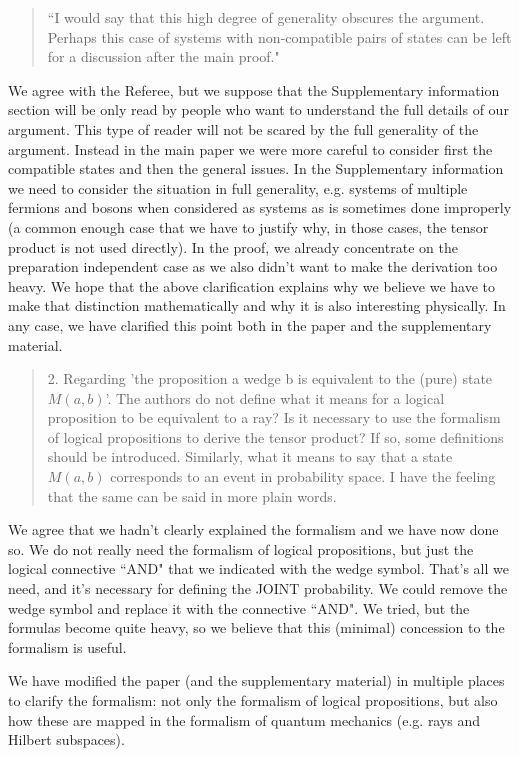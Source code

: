 \documentclass[11pt]{article}
\begin{document}
\begin{quote}
``I would say that this high degree of generality obscures
the argument. Perhaps this case of systems with non-compatible pairs
of states can be left for a discussion after the main proof."
\end{quote}
We agree with the Referee, but we suppose that the Supplementary
information section will be only read by people who want to understand
the full details of our argument. This type of reader will not be
scared by the full generality of the argument. Instead in the main
paper we were more careful to consider first the compatible states and
then the general issues. In the Supplementary information we need to
consider the situation in full generality, e.g.  systems of multiple
fermions and bosons when considered as systems as is sometimes done
improperly (a common enough case that we have to justify why, in those
cases, the tensor product is not used directly). In the proof, we
already concentrate on the preparation independent case as we also
didn't want to make the derivation too heavy. We hope that the above
clarification explains why we believe we have to make that distinction
mathematically and why it is also interesting physically. In any case,
we have clarified this point both in the paper and the supplementary
material.

\begin{quote}
2. Regarding 'the proposition a wedge b is equivalent to
the (pure) state $M (a, b)$'. The authors do not define what it means
for a logical proposition to be equivalent to a ray? Is it necessary
to use the formalism of logical propositions to derive the tensor
product? If so, some definitions should be introduced.  Similarly,
what it means to say that a state $M (a, b)$ corresponds to an event in
probability space. I have the feeling that the same can be said in
more plain words.
\end{quote}

We agree that we hadn't clearly explained the formalism and we have
now done so. We do not really need the formalism of logical
propositions, but just the logical connective ``AND" that we indicated
with the wedge symbol. That's all we need, and it's necessary for
defining the JOINT probability. We could remove the wedge symbol and
replace it with the connective ``AND". We tried, but the formulas
become quite heavy, so we believe that this (minimal) concession to
the formalism is useful. 
	
We have modified the paper (and the supplementary material) in
multiple places to clarify the formalism: not only the formalism of
logical propositions, but also how these are mapped in the formalism of quantum mechanics
(e.g. rays and Hilbert subspaces).
\end{document}
